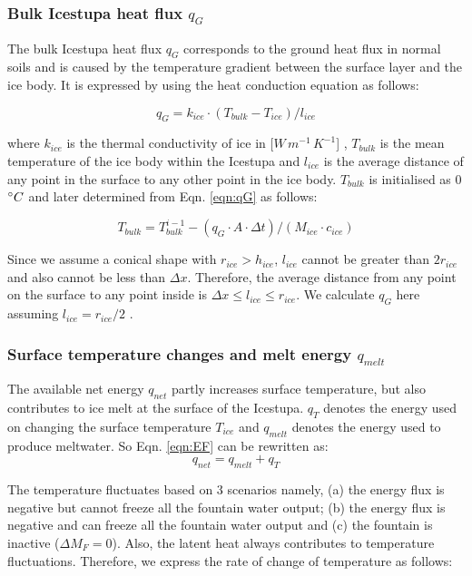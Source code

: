 \documentclass[utf8]{frontiersSCNS} %
\begin{document}
\subsubsection{Bulk Icestupa heat flux $q_{G}$} \label{sec:Bulkflux} The bulk Icestupa heat flux $q_{G}$ corresponds to
the ground heat flux in normal soils and is caused by the temperature gradient between the surface layer and the ice
body. It is expressed by using the heat conduction equation as follows:

\begin{equation} q_{G} = k_{ice} \cdot (T_{bulk}-T_{ice})/l_{ice} \label{eqn:qG}    \end{equation}

where $k_{ice}$ is the thermal conductivity of ice in [$W\, m^{-1}\,K^{-1}$] , $T_{bulk}$ is the mean temperature of the
ice body within the Icestupa and $l_{ice}$ is the average distance of any point in the surface to any other point in the
ice body. $T_{bulk}$ is initialised as 0 $\degree C$ and later determined from Eqn. \ref{eqn:qG} as follows:

\begin{equation} T_{bulk} = T_{bulk}^{i-1} - (q_{G} \cdot A \cdot \Delta t)/(M_{ice} \cdot c_{ice}) \end{equation}

Since we assume a conical shape with $r_{ice} > h_{ice}$, $l_{ice}$ cannot be greater than $2r_{ice}$ and also cannot be
less than $\Delta x$. Therefore, the average distance from any point on the surface to any point inside is $\Delta x
\leq l_{ice} \leq r_{ice}$. We calculate $q_{G}$ here assuming $l_{ice} = r_{ice}/2$ .

\subsubsection{Surface temperature changes and melt energy $q_{melt}$}

The available net energy $q_{net}$ partly increases surface temperature, but also contributes to ice melt at the surface
of the Icestupa. $q_{T}$ denotes the energy used on changing the surface temperature $T_{ice}$ and $q_{melt}$ denotes
the energy used to produce meltwater. So Eqn. \ref{eqn:EF} can be rewritten as: \begin{equation} q_{net} = q_{melt} +
  q_{T} \end{equation}

The temperature fluctuates based on 3 scenarios namely, (a) the energy flux is negative but cannot freeze all the
fountain water output; (b) the energy flux is negative and can freeze all the fountain water output and (c) the fountain
is inactive ($\Delta M_{F}=0$). Also, the latent heat always contributes to temperature fluctuations. Therefore, we
express the rate of change of temperature as follows:
\end{document}
